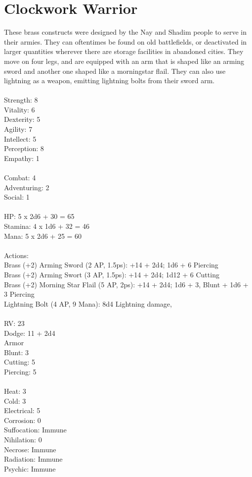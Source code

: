 \section{Clockwork Warrior}

These brass constructs were designed by the Nay and Shadim people to serve in their armies. They can oftentimes be found on old battlefields, or deactivated in larger quantities wherever there are storage facilities in abandoned cities. They move on four legs, and are equipped with an arm that is shaped like an arming sword and another one shaped like a morningstar flail. They can also use lightning as a weapon, emitting lightning bolts from their sword arm.\\
\\
Strength: 8\\
Vitality: 6\\
Dexterity: 5\\
Agility: 7\\
Intellect: 5\\
Perception: 8\\
Empathy: 1\\
\\
Combat: 4\\
Adventuring: 2\\
Social: 1\\
\\
HP: 5 x 2d6 + 30 = 65\\
Stamina: 4 x 1d6 + 32 = 46\\
Mana: 5 x 2d6 + 25 = 60\\
\\
Actions:\\
Brass (+2) Arming Sword (2 AP, 1.5ps): +14 + 2d4; 1d6 + 6 Piercing\\
Brass (+2) Arming Swort (3 AP, 1.5ps): +14 + 2d4; 1d12 + 6 Cutting\\
Brass (+2) Morning Star Flail (5 AP, 2ps): +14 + 2d4; 1d6 + 3, Blunt + 1d6 + 3 Piercing\\
Lightning Bolt (4 AP, 9 Mana): 8d4 Lightning damage,\\
\\
RV: 23\\
Dodge: 11 + 2d4\\
Armor\\
Blunt: 3\\
Cutting: 5\\
Piercing: 5\\
\\
Heat: 3\\
Cold: 3\\
Electrical: 5\\
Corrosion: 0\\
Suffocation: Immune\\
Nihilation: 0\\
Necrose: Immune\\
Radiation: Immune\\
Psychic: Immune\\